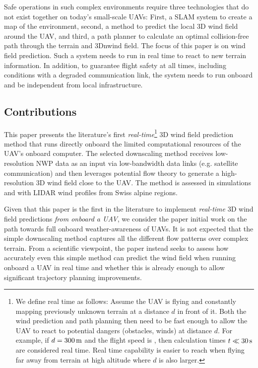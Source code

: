 \documentclass[twocolumn,letterpaper]{IEEEAerospaceCLS}
\begin{document}
Safe operations in such complex environments require three technologies that do not exist together on today's small-scale UAVs: First, a \ac{SLAM} system to create a map of the environment, second, a method to predict the local 3D wind field around the \ac{UAV}, and third, a path planner to calculate an optimal collision-free path through the terrain and 3Dnwind field. The focus of this paper is on wind field prediction. Such a system needs to run in real time to react to new terrain information. In addition, to guarantee flight safety at all times, including conditions with a degraded communication link, the system needs to run onboard and be independent from local infrastructure.

\subsection{Contributions}
\label{sec:PL_Intro_Contributions}

This paper presents the literature's first \emph{real-time}\footnote{We define real time as follows: Assume the UAV is flying and constantly mapping previously unknown terrain at a distance $d$ in front of it. Both the wind prediction and path planning then need to be fast enough to allow the UAV to react to potential dangers (obstacles, winds) at distance $d$. For example, if $d=\unit[300]{m}$ and the flight speed is , then calculation times $t\ll\unit[30]{s}$ are considered real time. Real time capability is easier to reach when flying far away from terrain at high altitude where $d$ is also larger.} 3D wind field prediction method that runs directly onboard the limited computational resources of the \ac{UAV}'s onboard computer. The selected downscaling method receives low-resolution \ac{NWP} data as an input via low-bandwidth data links (e.g. satellite communication) and then leverages potential flow theory to generate a high-resolution 3D wind field close to the \ac{UAV}. The method is assessed in simulations and with LIDAR wind profiles from Swiss alpine regions.

Given that this paper is the first in the literature to implement \emph{real-time} 3D wind field predictions \emph{from onboard a \ac{UAV}}, we consider the paper initial work on the path towards full onboard weather-awareness of UAVs. It is not expected that the simple downscaling method captures all the different flow patterns over complex terrain. From a scientific viewpoint, the paper instead seeks to assess how accurately even this simple method can predict the wind field when running onboard a \ac{UAV} in real time and whether this is already enough to allow significant trajectory planning improvements.
\end{document}
